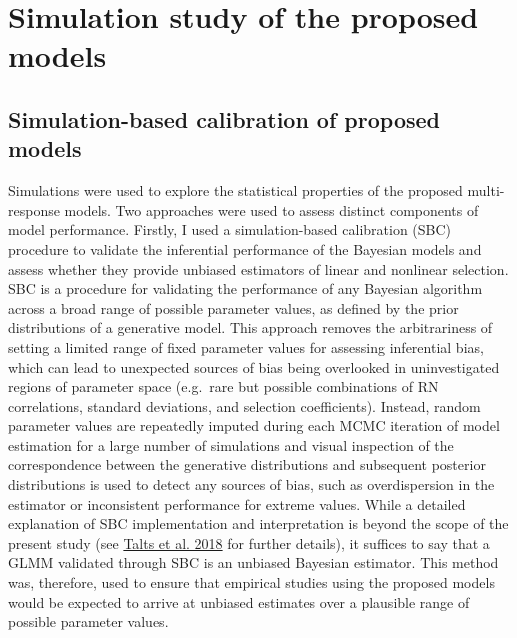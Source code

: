 \documentclass{article}
\begin{document}
\hypertarget{simulation-study-of-the-proposed-models}{%
\section{Simulation study of the proposed
models}\label{simulation-study-of-the-proposed-models}}

\hypertarget{simulation-based-calibration-of-proposed-models}{%
\subsection{Simulation-based calibration of proposed
models}\label{simulation-based-calibration-of-proposed-models}}

Simulations were used to explore the statistical properties of the
proposed multi-response models. Two approaches were used to assess
distinct components of model performance. Firstly, I used a
simulation-based calibration (SBC) procedure to validate the inferential
performance of the Bayesian models and assess whether they provide
unbiased estimators of linear and nonlinear selection. SBC is a
procedure for validating the performance of any Bayesian algorithm
across a broad range of possible parameter values, as defined by the
prior distributions of a generative model. This approach removes the
arbitrariness of setting a limited range of fixed parameter values for
assessing inferential bias, which can lead to unexpected sources of bias
being overlooked in uninvestigated regions of parameter space (e.g.~rare
but possible combinations of RN correlations, standard deviations, and
selection coefficients). Instead, random parameter values are repeatedly
imputed during each MCMC iteration of model estimation for a large
number of simulations and visual inspection of the correspondence
between the generative distributions and subsequent posterior
distributions is used to detect any sources of bias, such as
overdispersion in the estimator or inconsistent performance for extreme
values. While a detailed explanation of SBC implementation and
interpretation is beyond the scope of the present study (see
\protect\hyperlink{ref-Talts2018}{Talts et al. 2018} for further
details), it suffices to say that a GLMM validated through SBC is an
unbiased Bayesian estimator. This method was, therefore, used to ensure
that empirical studies using the proposed models would be expected to
arrive at unbiased estimates over a plausible range of possible
parameter values.
\end{document}
